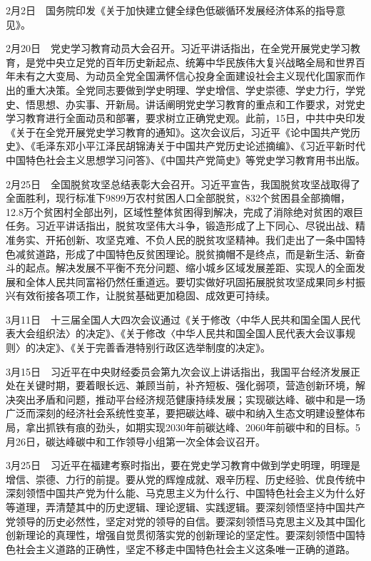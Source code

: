 \documentclass[10pt,a4paper,twocolumn]{book}
\begin{document}
2月2日　国务院印发《关于加快建立健全绿色低碳循环发展经济体系的指导意见》。

2月20日　党史学习教育动员大会召开。习近平讲话指出，在全党开展党史学习教育，是党中央立足党的百年历史新起点、统筹中华民族伟大复兴战略全局和世界百年未有之大变局、为动员全党全国满怀信心投身全面建设社会主义现代化国家而作出的重大决策。全党同志要做到学史明理、学史增信、学史崇德、学史力行，学党史、悟思想、办实事、开新局。讲话阐明党史学习教育的重点和工作要求，对党史学习教育进行全面动员和部署，要求树立正确党史观。此前，15日，中共中央印发《关于在全党开展党史学习教育的通知》。这次会议后，习近平《论中国共产党历史》、《毛泽东邓小平江泽民胡锦涛关于中国共产党历史论述摘编》、《习近平新时代中国特色社会主义思想学习问答》、《中国共产党简史》等党史学习教育用书出版。

2月25日　全国脱贫攻坚总结表彰大会召开。习近平宣告，我国脱贫攻坚战取得了全面胜利，现行标准下9899万农村贫困人口全部脱贫，832个贫困县全部摘帽，12.8万个贫困村全部出列，区域性整体贫困得到解决，完成了消除绝对贫困的艰巨任务。习近平讲话指出，脱贫攻坚伟大斗争，锻造形成了上下同心、尽锐出战、精准务实、开拓创新、攻坚克难、不负人民的脱贫攻坚精神。我们走出了一条中国特色减贫道路，形成了中国特色反贫困理论。脱贫摘帽不是终点，而是新生活、新奋斗的起点。解决发展不平衡不充分问题、缩小城乡区域发展差距、实现人的全面发展和全体人民共同富裕仍然任重道远。要切实做好巩固拓展脱贫攻坚成果同乡村振兴有效衔接各项工作，让脱贫基础更加稳固、成效更可持续。

3月11日　十三届全国人大四次会议通过《关于修改〈中华人民共和国全国人民代表大会组织法〉的决定》、《关于修改〈中华人民共和国全国人民代表大会议事规则〉的决定》、《关于完善香港特别行政区选举制度的决定》。

3月15日　习近平在中央财经委员会第九次会议上讲话指出，我国平台经济发展正处在关键时期，要着眼长远、兼顾当前，补齐短板、强化弱项，营造创新环境，解决突出矛盾和问题，推动平台经济规范健康持续发展；实现碳达峰、碳中和是一场广泛而深刻的经济社会系统性变革，要把碳达峰、碳中和纳入生态文明建设整体布局，拿出抓铁有痕的劲头，如期实现2030年前碳达峰、2060年前碳中和的目标。5月26日，碳达峰碳中和工作领导小组第一次全体会议召开。

3月25日　习近平在福建考察时指出，要在党史学习教育中做到学史明理，明理是增信、崇德、力行的前提。要从党的辉煌成就、艰辛历程、历史经验、优良传统中深刻领悟中国共产党为什么能、马克思主义为什么行、中国特色社会主义为什么好等道理，弄清楚其中的历史逻辑、理论逻辑、实践逻辑。要深刻领悟坚持中国共产党领导的历史必然性，坚定对党的领导的自信。要深刻领悟马克思主义及其中国化创新理论的真理性，增强自觉贯彻落实党的创新理论的坚定性。要深刻领悟中国特色社会主义道路的正确性，坚定不移走中国特色社会主义这条唯一正确的道路。
\end{document}
